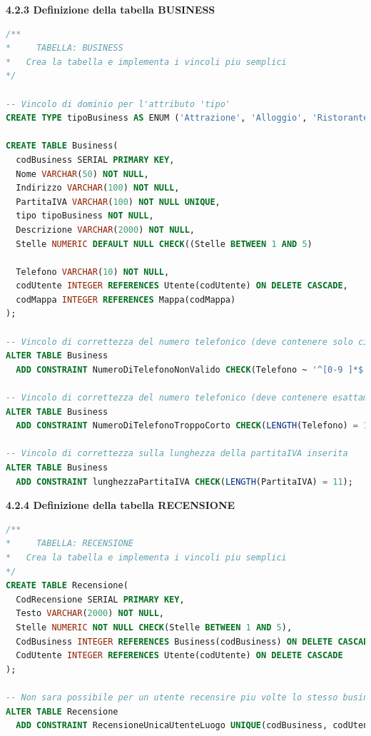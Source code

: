 \documentclass[a4paper,12pt]{article}
\begin{document}
\newpage\null{}\setcounter{page}{14}
\vspace{-2cm}
{\flushleft \bf 4.2.3  Definizione della tabella BUSINESS}
\begin{lstlisting}[language=SQL]
/**
*	  TABELLA: BUSINESS
*   Crea la tabella e implementa i vincoli piu semplici
*/

-- Vincolo di dominio per l'attributo 'tipo'
CREATE TYPE tipoBusiness AS ENUM ('Attrazione', 'Alloggio', 'Ristorante');

CREATE TABLE Business(
  codBusiness SERIAL PRIMARY KEY,
  Nome VARCHAR(50) NOT NULL,
  Indirizzo VARCHAR(100) NOT NULL,
  PartitaIVA VARCHAR(100) NOT NULL UNIQUE,
  tipo tipoBusiness NOT NULL,
  Descrizione VARCHAR(2000) NOT NULL,
  Stelle NUMERIC DEFAULT NULL CHECK((Stelle BETWEEN 1 AND 5) 
  									 									OR Stelle IS NULL),
  Telefono VARCHAR(10) NOT NULL,
  codUtente INTEGER REFERENCES Utente(codUtente) ON DELETE CASCADE,
  codMappa INTEGER REFERENCES Mappa(codMappa)
);

-- Vincolo di correttezza del numero telefonico (deve contenere solo cifre)
ALTER TABLE Business
  ADD CONSTRAINT NumeroDiTelefonoNonValido CHECK(Telefono ~ '^[0-9 ]*$');

-- Vincolo di correttezza del numero telefonico (deve contenere esattamente 10 cifre)
ALTER TABLE Business
  ADD CONSTRAINT NumeroDiTelefonoTroppoCorto CHECK(LENGTH(Telefono) = 10);

-- Vincolo di correttezza sulla lunghezza della partitaIVA inserita
ALTER TABLE Business
  ADD CONSTRAINT lunghezzaPartitaIVA CHECK(LENGTH(PartitaIVA) = 11);
\end{lstlisting}

\vspace*{+1cm}

{\flushleft \bf 4.2.4  Definizione della tabella RECENSIONE}
\begin{lstlisting}[language=SQL]
/**
*	  TABELLA: RECENSIONE
*   Crea la tabella e implementa i vincoli piu semplici
*/
CREATE TABLE Recensione(
  CodRecensione SERIAL PRIMARY KEY,
  Testo VARCHAR(2000) NOT NULL,
  Stelle NUMERIC NOT NULL CHECK(Stelle BETWEEN 1 AND 5),
  CodBusiness INTEGER REFERENCES Business(codBusiness) ON DELETE CASCADE,
  CodUtente INTEGER REFERENCES Utente(codUtente) ON DELETE CASCADE
);

-- Non sara possibile per un utente recensire piu volte lo stesso business
ALTER TABLE Recensione
  ADD CONSTRAINT RecensioneUnicaUtenteLuogo UNIQUE(codBusiness, codUtente);
\end{lstlisting}
\newpage
\end{document}
